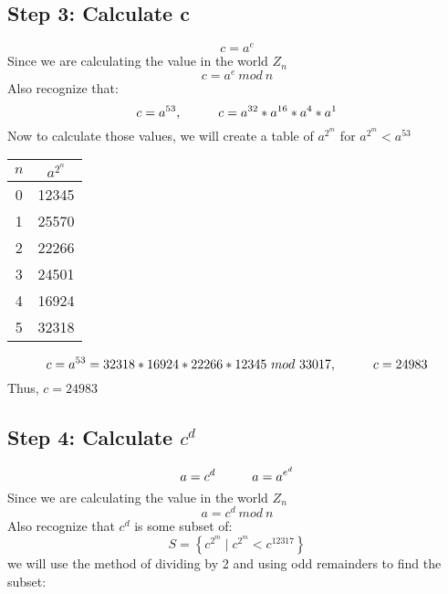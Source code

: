 \documentclass{Algorithms}
\begin{document}
\subsection{Step 3: Calculate c}
\begin{equation}
  c = a^e
\end{equation}
Since we are calculating the value in the world $Z_n$
\begin{equation}
c = a^e\ mod\ n
\end{equation}
Also recognize that:
\begin{equation}
  c = a^{53}, \hspace*{1cm} c = a^{32} * a^{16} * a^4 * a^1
\end{equation}
Now to calculate those values, we will create a table of $a^{2^m}$ for $a^{2^m} < a^{53}$\\
\begin{tabular}{c|c}
  $n$ &$a^{2^n}$ \\ \hline
  0 & 12345 \\
  1 & 25570 \\
  2 & 22266 \\
  3 & 24501 \\
  4 & 16924 \\
  5 & 32318 \\
\end{tabular}
\begin{equation}
  c= a^{53} = 32318 * 16924 * 22266 * 12345\ mod\ 33017,\hspace*{1cm} c = 24983
\end{equation}
Thus, $c = 24983$
\subsection{Step 4: Calculate $c^d$}
\begin{equation}
  a = c^d \hspace*{1cm} a = a^{e^d}
\end{equation}
Since we are calculating the value in the world $Z_n$
\begin{equation}
 a = c^d\ mod\ n
\end{equation}
Also recognize that $c^d$ is some subset of:
\begin{equation*}
  S = \left\{c^{2^m} \mid c^{2^m} < c^{12317}\right\}
\end{equation*}
we will use the method of dividing by 2 and using odd remainders to find the subset:
\end{document}
